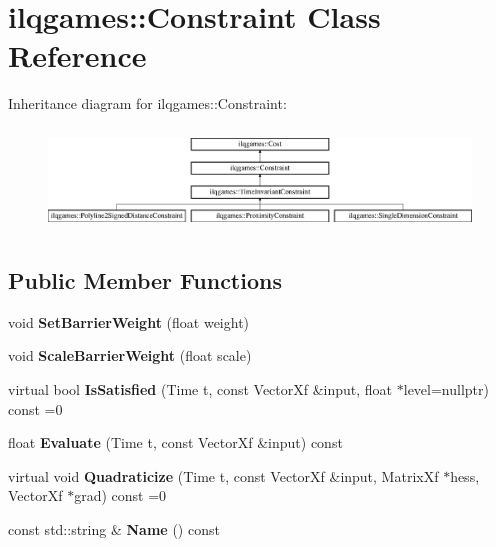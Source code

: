 \hypertarget{classilqgames_1_1_constraint}{}\section{ilqgames\+:\+:Constraint Class Reference}
\label{classilqgames_1_1_constraint}
Inheritance diagram for ilqgames\+:\+:Constraint\+:\begin{figure}[H]
\begin{center}
\leavevmode
\includegraphics[height=2.755228cm]{classilqgames_1_1_constraint}
\end{center}
\end{figure}
\subsection*{Public Member Functions}
\begin{DoxyCompactItemize}
\item 
void {\bfseries Set\+Barrier\+Weight} (float weight)\hypertarget{classilqgames_1_1_constraint_a9a0278d47a5c2309174ce27567cd7a2e}{}\label{classilqgames_1_1_constraint_a9a0278d47a5c2309174ce27567cd7a2e}

\item 
void {\bfseries Scale\+Barrier\+Weight} (float scale)\hypertarget{classilqgames_1_1_constraint_a6474f6bbb0b2170254491062312e70f1}{}\label{classilqgames_1_1_constraint_a6474f6bbb0b2170254491062312e70f1}

\item 
virtual bool {\bfseries Is\+Satisfied} (Time t, const Vector\+Xf \&input, float $\ast$level=nullptr) const =0\hypertarget{classilqgames_1_1_constraint_acde97673b03d18973c9495ba6b17ec67}{}\label{classilqgames_1_1_constraint_acde97673b03d18973c9495ba6b17ec67}

\item 
float {\bfseries Evaluate} (Time t, const Vector\+Xf \&input) const \hypertarget{classilqgames_1_1_constraint_aa9d8f8f9cf80d4de4e861c00d8e04df8}{}\label{classilqgames_1_1_constraint_aa9d8f8f9cf80d4de4e861c00d8e04df8}

\item 
virtual void {\bfseries Quadraticize} (Time t, const Vector\+Xf \&input, Matrix\+Xf $\ast$hess, Vector\+Xf $\ast$grad) const =0\hypertarget{classilqgames_1_1_constraint_a94538ad0da7e881d1a3bd4009c43f775}{}\label{classilqgames_1_1_constraint_a94538ad0da7e881d1a3bd4009c43f775}

\item 
const std\+::string \& {\bfseries Name} () const \hypertarget{classilqgames_1_1_constraint_acfd5c87edfefcb710716e72045684e84}{}\label{classilqgames_1_1_constraint_acfd5c87edfefcb710716e72045684e84}

\end{DoxyCompactItemize}
